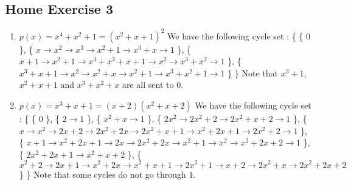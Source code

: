 \documentclass{article}
\begin{document}
\subsection{Home Exercise 3}

\begin{enumerate}
    \item $p(x)=x^4+x^2+1=(x^2+x+1)^2$ \newline
    We have the following cycle set :\newline
    \{ \{ 0 \}, \newline
    \{ $x \longrightarrow x^2 \longrightarrow x^3 \longrightarrow x^2+1 \longrightarrow x^3+x \longrightarrow 1$ \}, \newline
    \{ $x+1 \longrightarrow x^2+1 \longrightarrow x^3+x^2+x+1 \longrightarrow x^2 \longrightarrow x^3+x^2 \longrightarrow 1$ \}, \newline
    \{ $x^3+x+1 \longrightarrow x^2 \longrightarrow x^2+x \longrightarrow x^2+1 \longrightarrow x^3+x^2+1 \longrightarrow 1$ \} \} \newline
    Note that $x^3+1$, $x^2+x+1$ and $x^3+x^2+x$ are all sent to $0$.

    \item $p(x)=x^3+x+1=(x+2)(x^2+x+2)$ \newline
    We have the following cycle set :\newline
    \{ \{ 0 \}, \newline
    \{ $2 \longrightarrow 1$ \}, \newline
    \{ $x^2+x \longrightarrow 1$ \}, \newline
    \{ $2x^2 \longrightarrow 2x^2+2\longrightarrow 2x^2+x+2 \longrightarrow 1$ \}, \newline
    \{ $x \longrightarrow x^2 \longrightarrow 2x+2 \longrightarrow 2x^2+2x \longrightarrow 2x^2+x+1 \longrightarrow x^2+2x+1 \longrightarrow 2x^2+2 \longrightarrow 1$ \}, \newline
    \{ $x+1 \longrightarrow x^2+2x+1 \longrightarrow 2x \longrightarrow 2x^2+2x \longrightarrow x^2+1 \longrightarrow x^2 \longrightarrow x^2+2x+2 \longrightarrow 1$ \}, \newline
    \{ $2x^2+2x+1 \longrightarrow x^2+x+2$ \}, \newline
    \{ $x^2+2 \longrightarrow 2x+1 \longrightarrow x^2+2x \longrightarrow x^2+x+1 \longrightarrow 2x^2+1 \longrightarrow x+2 \longrightarrow 2x^2+x \longrightarrow 2x^2+2x+2$ \} \} \newline
    Note that some cycles do not go through $1$.
\end{enumerate}
\end{document}
